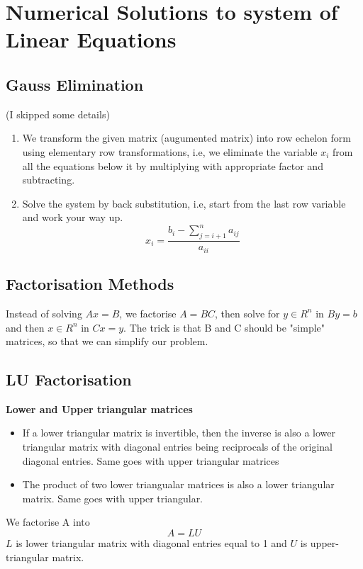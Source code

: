 \documentclass{article}
\begin{document}
\section{Numerical Solutions to system of Linear Equations}
	
	\subsection{Gauss Elimination}
	({I skipped some details})
		\begin{enumerate}
			\item We transform the given matrix (augumented matrix) into row echelon form using elementary row transformations, i.e, we eliminate the variable $x_i$ from all the equations below it by multiplying with appropriate factor and subtracting. 
			\item Solve the system by back substitution, i.e, start from the last row variable and work your way up.
			\[x_i = \frac{b_i - \sum_{j=i+1}^n a_{ij}}{a_{ii}}\]
		\end{enumerate}

	\subsection*{Factorisation Methods}
		Instead of solving $Ax = B$, we factorise $A=BC$, then solve for $y\in R^n$ in $By = b$ and then $x\in R^n$ in $Cx = y$. The trick is that B and C should be "simple" matrices, so that we can simplify our problem.

	\subsection{LU Factorisation}

		\textbf{Lower and Upper triangular matrices}
		\begin{itemize}
			\item If a lower triangular matrix is invertible, then the inverse is also a lower triangular matrix with diagonal entries being reciprocals of the original diagonal entries. Same goes with upper triangular matrices
			\item The product of two lower triangualar matrices is also a lower triangular matrix. Same goes with upper triangular.
		\end{itemize}

		We factorise A into 
			\[A = LU\]
		$L$ is lower triangular matrix with diagonal entries equal to 1 and $U$ is upper-triangular matrix.
\end{document}
